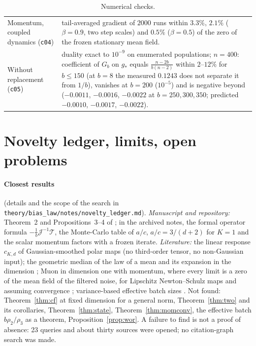 \documentclass[10pt]{article}
\theoremstyle{definition}
\theoremstyle{remark}
\begin{document}
\begin{table}[h]
\begin{tabular}{@{}p{}p{}@{}}
Momentum, coupled dynamics (\texttt{c04}) & tail-averaged gradient of $2000$ runs within $3.3\%$, $2.1\%$ ($\beta=0.9$, two
step scales) and $0.5\%$ ($\beta=0.5$) of the zero of the frozen stationary mean field.\\
Without replacement (\texttt{c05}) & duality exact to $10^{-9}$ on enumerated populations; $n=400$: coefficient of $G_b$ on
$g_\ast$ equals $\frac{n-2b}{b(n-2)}$ within $2$--$12\%$ for $b\le150$ (at $b=8$ the measured $0.1243$ does not separate
it from $1/b$), vanishes at $b=200$ ($10^{-5}$) and is negative
beyond ($-0.0011$, $-0.0016$, $-0.0022$ at $b=250,300,350$; predicted $-0.0010$, $-0.0017$, $-0.0022$).\\
\bottomrule
\end{tabular}
\caption{Numerical checks.}\label{tab:checks}
\end{table}

\section{Novelty ledger, limits, open problems}\label{sec:ledger}

\paragraph{Closest results} (details and the scope of the search in \texttt{theory/bias\_law/notes/novelty\_ledger.md}).
\emph{Manuscript and repository:} Theorem~2 and Propositions~3--4 of \cite{manuscript}; in the archived notes, the formal
operator formula $-\frac1b\mathcal J^{-1}\mathcal T$, the Monte-Carlo table of $a/c$, $a/c=3/(d+2)$ for $K=1$ and the
scalar momentum factors with a frozen iterate. \emph{Literature:} the linear response $c_{K,d}$ of Gaussian-smoothed
polar maps \cite{xie,chen} (no third-order tensor, no non-Gaussian input); the geometric median of the law of a mean
\cite{minsker} and its expansion in the dimension \cite{schwank}; Muon in dimension one with momentum, where every
limit is a zero of the mean field of the filtered noise, for Lipschitz Newton--Schulz maps and assuming convergence
\cite{ddj}; variance-based effective batch sizes \cite{paquette,chen}. Not found: Theorem~\ref{thm:cf} at fixed
dimension for a general norm, Theorem~\ref{thm:two} and its corollaries, Theorem~\ref{thm:state},
Theorem~\ref{thm:momconv}, the effective batch $b\rho_2/\rho_3$ as a theorem, Proposition~\ref{prop:wor}. A failure to
find is not a proof of absence: 23 queries and about thirty sources were opened; no citation-graph search was made.
\end{document}

